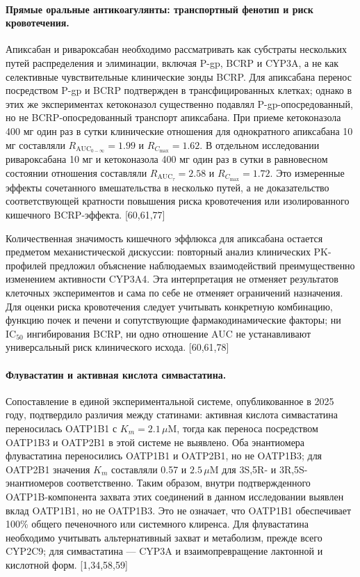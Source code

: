 \documentclass[11pt]{article}
\begin{document}
\paragraph{Прямые оральные антикоагулянты: транспортный фенотип и риск кровотечения.}
Апиксабан и ривароксабан необходимо рассматривать как субстраты нескольких путей распределения и элиминации, включая P-gp, BCRP и CYP3A, а не как селективные чувствительные клинические зонды BCRP. Для апиксабана перенос посредством P-gp и BCRP подтвержден в трансфицированных клетках; однако в этих же экспериментах кетоконазол существенно подавлял P-gp-опосредованный, но не BCRP-опосредованный транспорт апиксабана. При приеме кетоконазола 400 мг один раз в сутки клинические отношения для однократного апиксабана 10 мг составляли \(R_{\mathrm{AUC}_{0-\infty}}=1.99\) и \(R_{C_{\max}}=1.62\). В отдельном исследовании ривароксабана 10 мг и кетоконазола 400 мг один раз в сутки в равновесном состоянии отношения составляли \(R_{\mathrm{AUC}_{\tau}}=2.58\) и \(R_{C_{\max}}=1.72\). Это измеренные эффекты сочетанного вмешательства в несколько путей, а не доказательство соответствующей кратности повышения риска кровотечения или изолированного кишечного BCRP-эффекта. [60,61,77]

Количественная значимость кишечного эффлюкса для апиксабана остается предметом механистической дискуссии: повторный анализ клинических PK-профилей предложил объяснение наблюдаемых взаимодействий преимущественно изменением активности CYP3A4. Эта интерпретация не отменяет результатов клеточных экспериментов и сама по себе не отменяет ограничений назначения. Для оценки риска кровотечения следует учитывать конкретную комбинацию, функцию почек и печени и сопутствующие фармакодинамические факторы; ни \(\mathrm{IC}_{50}\) ингибирования BCRP, ни одно отношение AUC не устанавливают универсальный риск клинического исхода. [60,61,78]

\paragraph{Флувастатин и активная кислота симвастатина.}
Сопоставление в единой экспериментальной системе, опубликованное в 2025 году, подтвердило различия между статинами: активная кислота симвастатина переносилась OATP1B1 с \(K_m=2.1\,\mu\mathrm{M}\), тогда как переноса посредством OATP1B3 и OATP2B1 в этой системе не выявлено. Оба энантиомера флувастатина переносились OATP1B1 и OATP2B1, но не OATP1B3; для OATP2B1 значения \(K_m\) составляли 0.57 и \(2.5\,\mu\mathrm{M}\) для 3S,5R- и 3R,5S-энантиомеров соответственно. Таким образом, внутри подтвержденного OATP1B-компонента захвата этих соединений в данном исследовании выявлен вклад OATP1B1, но не OATP1B3. Это не означает, что OATP1B1 обеспечивает 100\% общего печеночного или системного клиренса. Для флувастатина необходимо учитывать альтернативный захват и метаболизм, прежде всего CYP2C9; для симвастатина --- CYP3A и взаимопревращение лактонной и кислотной форм. [1,34,58,59]
\end{document}
